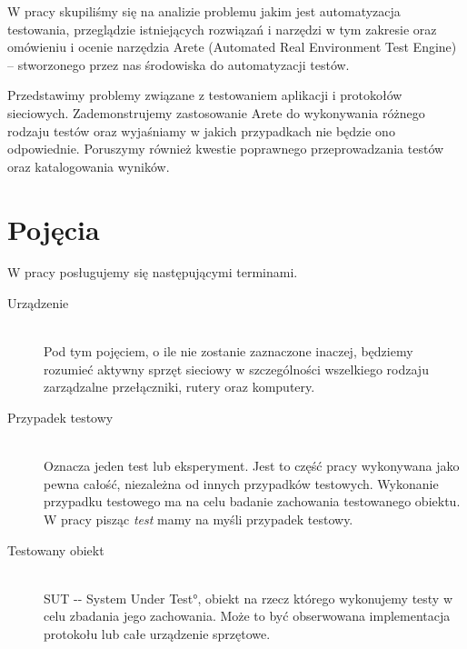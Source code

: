 \documentclass[00-praca-magisterska.tex]{subfiles}
\begin{document}
W pracy skupiliśmy się na analizie problemu jakim jest automatyzacja
testowania, przeglądzie istniejących rozwiązań i narzędzi w tym zakresie oraz
omówieniu i ocenie narzędzia Arete (Automated Real Environment Test Engine) --
stworzonego przez nas środowiska do automatyzacji testów.

Przedstawimy problemy związane z testowaniem aplikacji i protokołów sieciowych.
Zademonstrujemy zastosowanie Arete do wykonywania różnego rodzaju testów oraz
wyjaśniamy w jakich przypadkach nie będzie ono odpowiednie. Poruszymy również
kwestie poprawnego przeprowadzania testów oraz katalogowania wyników.

\section{Pojęcia}

W pracy posługujemy się następującymi terminami. 

\begin{description}
  \item[Urządzenie] \hfill \\
Pod tym pojęciem, o ile nie zostanie zaznaczone inaczej, będziemy rozumieć
aktywny sprzęt sieciowy w szczególności wszelkiego rodzaju zarządzalne
przełączniki, rutery oraz komputery.
  \item[Przypadek testowy] \hfill \\
Oznacza jeden test lub eksperyment. Jest to część pracy wykonywana jako pewna
całość, niezależna od innych przypadków testowych. Wykonanie przypadku
testowego ma na celu badanie zachowania testowanego obiektu. W pracy pisząc
\emph{test} mamy na myśli przypadek testowy.
  \item[Testowany obiekt] \hfill \\
\ang{SUT -- System Under Test}, obiekt na rzecz którego wykonujemy testy w celu
zbadania jego zachowania. Może to być obserwowana implementacja protokołu lub
całe urządzenie sprzętowe.
\end{description}
\end{document}
